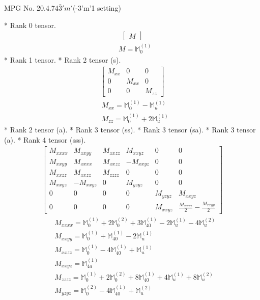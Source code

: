 \documentclass[fleqn,8pt,landscape]{jsarticle}
\begin{document}
\setcounter{MaxMatrixCols}{32}

\renewcommand{\tablename}{Table~}
\renewcommand{\figurename}{Figure~}
\begin{center}
\LARGE
MPG No. 20.4.74\quad$\bar{3}'m'$\quad(-3'm'1 setting)
\end{center}
* Rank 0 tensor.
\begin{align*}
\begin{bmatrix} M \end{bmatrix}
\end{align*}
\begin{align*}
& M = \mathbb{M}_{0}^{(1)}
\end{align*}
* Rank 1 tensor.
* Rank 2 tensor (s).
\begin{align*}
\begin{bmatrix} M_{xx} & 0 & 0 \\ 0 & M_{xx} & 0 \\ 0 & 0 & M_{zz} \end{bmatrix}
\end{align*}
\begin{align*}
& M_{xx} = \mathbb{M}_{0}^{(1)} - \mathbb{M}_{u}^{(1)} \\
& M_{zz} = \mathbb{M}_{0}^{(1)} + 2 \mathbb{M}_{u}^{(1)}
\end{align*}
* Rank 2 tensor (a).
* Rank 3 tensor (ss).
* Rank 3 tensor (sa).
* Rank 3 tensor (a).
* Rank 4 tensor (sss).
\begin{align*}
\begin{bmatrix} M_{xxxx} & M_{xxyy} & M_{xxzz} & M_{xxyz} & 0 & 0 \\ M_{xxyy} & M_{xxxx} & M_{xxzz} & - M_{xxyz} & 0 & 0 \\ M_{xxzz} & M_{xxzz} & M_{zzzz} & 0 & 0 & 0 \\ M_{xxyz} & - M_{xxyz} & 0 & M_{yzyz} & 0 & 0 \\ 0 & 0 & 0 & 0 & M_{yzyz} & M_{xxyz} \\ 0 & 0 & 0 & 0 & M_{xxyz} & \frac{M_{xxxx}}{2} - \frac{M_{xxyy}}{2} \end{bmatrix}
\end{align*}
\begin{align*}
& M_{xxxx} = \mathbb{M}_{0}^{(1)} + 2 \mathbb{M}_{0}^{(2)} + 3 \mathbb{M}_{40}^{(1)} - 2 \mathbb{M}_{u}^{(1)} - 4 \mathbb{M}_{u}^{(2)} \\
& M_{xxyy} = \mathbb{M}_{0}^{(1)} + \mathbb{M}_{40}^{(1)} - 2 \mathbb{M}_{u}^{(1)} \\
& M_{xxzz} = \mathbb{M}_{0}^{(1)} - 4 \mathbb{M}_{40}^{(1)} + \mathbb{M}_{u}^{(1)} \\
& M_{xxyz} = \mathbb{M}_{4a}^{(1)} \\
& M_{zzzz} = \mathbb{M}_{0}^{(1)} + 2 \mathbb{M}_{0}^{(2)} + 8 \mathbb{M}_{40}^{(1)} + 4 \mathbb{M}_{u}^{(1)} + 8 \mathbb{M}_{u}^{(2)} \\
& M_{yzyz} = \mathbb{M}_{0}^{(2)} - 4 \mathbb{M}_{40}^{(1)} + \mathbb{M}_{u}^{(2)}
\end{align*}
\end{document}

